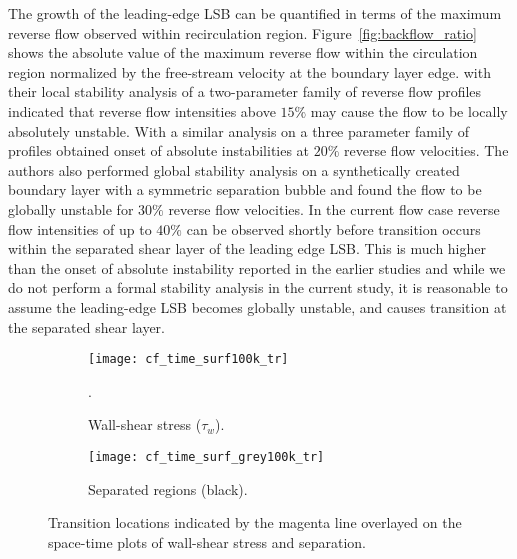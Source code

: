 The growth of the leading-edge LSB can be quantified in terms of the maximum reverse flow observed within recirculation region. Figure~\ref{fig:backflow_ratio} shows the absolute value of the maximum reverse flow within the circulation region normalized by the free-stream velocity at the boundary layer edge. \cite{alam00} with their local stability analysis of a two-parameter family of reverse flow profiles indicated that reverse flow intensities above $15\%$ may cause the flow to be locally absolutely unstable. With a similar analysis on a three parameter family of profiles \cite{hammond98} obtained onset of absolute instabilities at $20\%$ reverse flow velocities. The authors also performed global stability analysis on a synthetically created boundary layer with a symmetric separation bubble \citep{hammond98} and found the flow to be globally unstable for $30\%$ reverse flow velocities. In the current flow case reverse flow intensities of up to $40\%$ can be observed shortly before transition occurs within the separated shear layer of the leading edge LSB. This is much higher than the onset of absolute instability reported in the earlier studies and while we do not perform a formal stability analysis in the current study, it is reasonable to assume the leading-edge LSB becomes globally unstable, and causes transition at the separated shear layer. 
\begin{figure}[h]
	\centering
	\begin{subfigure}[t]{0.46\textwidth}
		\centering
		\texttt{[image: cf\_time\_surf100k\_tr]}
		\caption{Wall-shear stress ($\tau_{w}$).}. 
		\label{fig:cf-time_tr}
	\end{subfigure}
	\begin{subfigure}[t]{0.45\textwidth}
		\centering
		\texttt{[image: cf\_time\_surf\_grey100k\_tr]}
		\caption{Separated regions (black).} 
		\label{fig:separation-time_tr}
	\end{subfigure}
	\caption{Transition locations indicated by the magenta line overlayed on the space-time plots of wall-shear stress and separation.}
	\label{fig:space-time_tr}
\end{figure}


